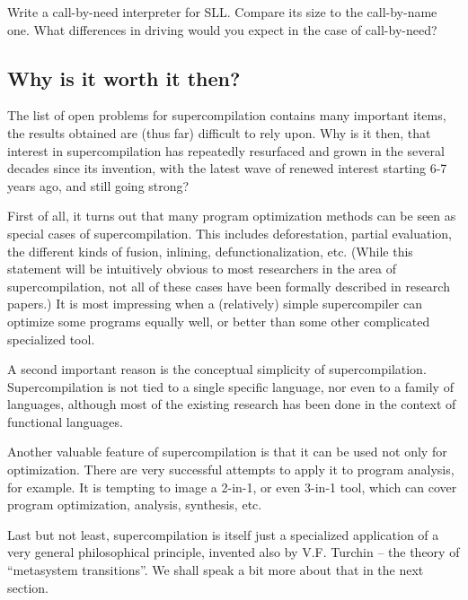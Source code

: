 \begin{exercise}
Write a call-by-need interpreter for SLL. 
Compare its size to the call-by-name one.
What differences in driving would you expect in the case of call-by-need?
\end{exercise}

\subsection{Why is it worth it then?}

The list of open problems for supercompilation contains many important items, 
the results obtained are (thus far) difficult to rely upon.
Why is it then, that interest in supercompilation has repeatedly 
resurfaced and grown in the several decades since its invention,
with the latest wave of renewed interest starting 6-7 years ago, and
still going strong?

First of all, it turns out that many program optimization methods can be
seen as special cases of supercompilation.
This includes deforestation, partial evaluation, the different kinds of fusion,
inlining, defunctionalization, etc. 
(While this statement will be intuitively obvious to most researchers in the 
area of supercompilation, not all of these cases have been formally
described in research papers.)
It is most impressing when a (relatively) simple supercompiler
can optimize some programs equally well, or better than some 
other complicated specialized tool.

A second important reason is the conceptual simplicity of supercompilation.
Supercompilation is not tied to a single specific language, nor even to a family
of languages, although most of the existing research has been done
in the context of functional languages.

Another valuable feature of supercompilation is that it can be used
not only for optimization. 
There are very successful attempts to apply it to program analysis, for example. 
It is tempting to image a 2-in-1, or even 3-in-1 tool,
which can cover program optimization, analysis, synthesis, etc.

Last but not least, supercompilation is itself just a specialized application
of a very general philosophical principle, invented also by V.F. Turchin --
the theory of ``metasystem transitions''. We shall speak a bit more
about that in the next section.
